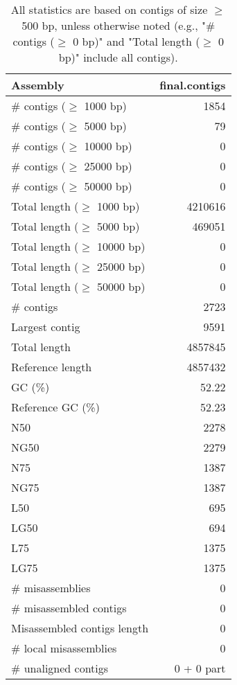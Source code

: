 \documentclass[12pt,a4paper]{article}
\begin{document}
\begin{table}[ht]
\begin{center}
\caption{All statistics are based on contigs of size $\geq$ 500 bp, unless otherwise noted (e.g., "\# contigs ($\geq$ 0 bp)" and "Total length ($\geq$ 0 bp)" include all contigs).}
\begin{tabular}{|l*{1}{|r}|}
\hline
Assembly & final.contigs \\ \hline
\# contigs ($\geq$ 1000 bp) & 1854 \\ \hline
\# contigs ($\geq$ 5000 bp) & 79 \\ \hline
\# contigs ($\geq$ 10000 bp) & 0 \\ \hline
\# contigs ($\geq$ 25000 bp) & 0 \\ \hline
\# contigs ($\geq$ 50000 bp) & 0 \\ \hline
Total length ($\geq$ 1000 bp) & 4210616 \\ \hline
Total length ($\geq$ 5000 bp) & 469051 \\ \hline
Total length ($\geq$ 10000 bp) & 0 \\ \hline
Total length ($\geq$ 25000 bp) & 0 \\ \hline
Total length ($\geq$ 50000 bp) & 0 \\ \hline
\# contigs & 2723 \\ \hline
Largest contig & 9591 \\ \hline
Total length & 4857845 \\ \hline
Reference length & 4857432 \\ \hline
GC (\%) & 52.22 \\ \hline
Reference GC (\%) & 52.23 \\ \hline
N50 & 2278 \\ \hline
NG50 & 2279 \\ \hline
N75 & 1387 \\ \hline
NG75 & 1387 \\ \hline
L50 & 695 \\ \hline
LG50 & 694 \\ \hline
L75 & 1375 \\ \hline
LG75 & 1375 \\ \hline
\# misassemblies & 0 \\ \hline
\# misassembled contigs & 0 \\ \hline
Misassembled contigs length & 0 \\ \hline
\# local misassemblies & 0 \\ \hline
\# unaligned contigs & 0 + 0 part \\ \hline

\end{tabular}
\end{center}
\end{table}
\end{document}
